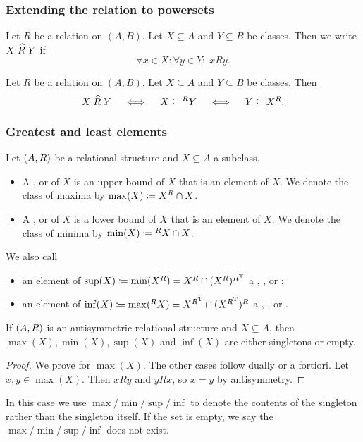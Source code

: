 \subsubsection{Extending the relation to powersets}
\begin{definition}
Let $R$ be a relation on $(A,B)$. Let $X\subseteq A$ and $Y\subseteq B$ be classes. Then we write $X\mathrel{\widehat{R}}Y$ if
\[ \forall x\in X: \forall y\in Y: \; xRy. \]
\end{definition}

\begin{lemma} \label{polarsSetRelation}
Let $R$ be a relation on $(A,B)$. Let $X\subseteq A$ and $Y\subseteq B$ be classes. Then
\[ X \mathrel{\widehat{R}} Y \quad\iff\quad X \subseteq {^RY} \quad\iff\quad Y \subseteq X^R. \]
\end{lemma}

\subsubsection{Greatest and least elements}
\begin{definition}
Let $\left( A, R \right)$ be a relational structure and $X\subseteq A$ a subclass.
\begin{itemize}
\item A ,  or  of $X$ is an upper bound of $X$ that is an element of $X$. We denote the class of maxima by $\max(X) \coloneqq X^R\cap X$.
\item A ,  or  of $X$ is a lower bound of $X$ that is an element of $X$. We denote the class of minima by $\min(X) \coloneqq {^RX}\cap X$.
\end{itemize}
We also call
\begin{itemize}
\item an element of $\sup(X) \coloneqq \min(X^R) = X^R \cap (X^R)^{R^{\mathrm{T}}}$ a , , or ;
\item an element of $\inf(X) \coloneqq \max({^RX}) = X^{R^{\mathrm{T}}} \cap (X^{R^{\mathrm{T}}})^R$ a , , or .
\end{itemize}
\end{definition}

\begin{lemma} \label{minMaxSingletons}
If $\left( A, R \right)$ is an antisymmetric relational structure and $X\subseteq A$, then $\max(X), \min(X), \sup(X)$ and $\inf(X)$ are either singletons or empty.
\end{lemma}
\begin{proof}
We prove for $\max(X)$. The other cases follow dually or a fortiori. Let $x,y\in \max(X)$. Then $xRy$ and $yRx$, so $x=y$ by antisymmetry.
\end{proof}
In this case we use $\max/\min/\sup/\inf$ to denote the contents of the singleton rather than the singleton itself. If the set is empty, we say the $\max/\min/\sup/\inf$ does not exist.

